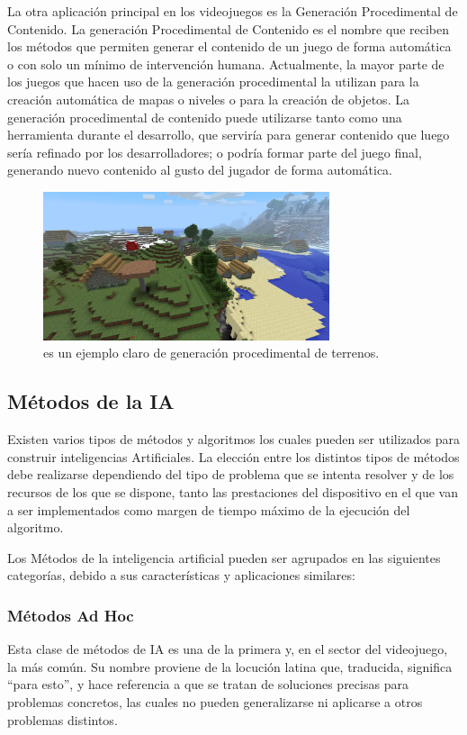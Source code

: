 La otra aplicación principal en los videojuegos es la Generación Procedimental de Contenido. La generación Procedimental de Contenido es el nombre que reciben los métodos que permiten generar el contenido de un juego de forma automática o con solo un mínimo de intervención humana. Actualmente, la mayor parte de los juegos que hacen uso de la generación procedimental la utilizan para la creación automática de mapas o niveles o para la creación de objetos. La generación procedimental de contenido puede utilizarse tanto como una herramienta durante el desarrollo, que serviría para generar contenido que luego sería refinado por los desarrolladores; o podría formar parte del juego final, generando nuevo contenido al gusto del jugador de forma automática.

\begin{figure}[h]
	\includegraphics[width=0.75\textwidth]{images/estadodelarte/ai/minecraft}
	\centering
	\caption{ es un ejemplo claro de generación procedimental de terrenos.}
\end{figure}

\subsection{Métodos de la IA}
Existen varios tipos de métodos y algoritmos los cuales pueden ser utilizados para construir inteligencias Artificiales. La elección entre los distintos tipos de métodos debe realizarse dependiendo del tipo de problema que se intenta resolver y de los recursos de los que se dispone, tanto las prestaciones del dispositivo en el que van a ser implementados como margen de tiempo máximo de la ejecución del algoritmo\cite{ai_and_games}. 

Los Métodos de la inteligencia artificial pueden ser agrupados en las siguientes categorías, debido a sus características y aplicaciones similares:

\subsubsection{Métodos Ad Hoc}
Esta clase de métodos de IA es una de la primera y, en el sector del videojuego, la más común. Su nombre proviene de la locución latina que, traducida, significa ``para esto'', y hace referencia a que se tratan de soluciones precisas para problemas concretos, las cuales no pueden generalizarse ni aplicarse a otros problemas distintos\cite{ai_and_games}.

